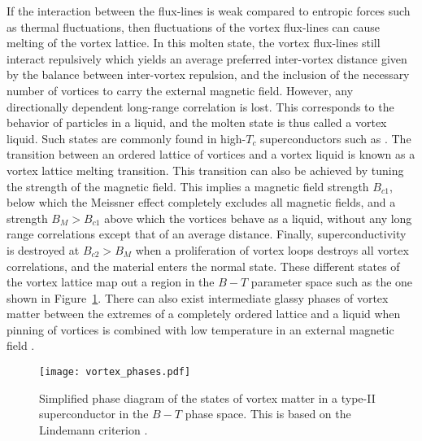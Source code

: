 If the interaction between the flux-lines is weak compared to entropic forces such as thermal fluctuations, then fluctuations of the vortex flux-lines can cause melting of the vortex lattice.
In this molten state, the vortex flux-lines still interact repulsively which yields an average preferred inter-vortex distance given by the balance between inter-vortex repulsion, and the inclusion of the
necessary number of vortices to carry the external magnetic field. However, any directionally dependent long-range correlation is lost. This corresponds to the behavior
of particles in a liquid, and the molten state is thus called a vortex liquid. Such states are commonly found in high-$T_c$ superconductors such as .
The transition between an ordered lattice of vortices and a vortex liquid is known as a vortex lattice melting transition.
This transition can also be achieved by tuning the strength of the magnetic field. This implies a magnetic field strength $B_{c1}$, below which the Meissner effect
completely excludes all magnetic fields, and a strength $B_{M}>B_{c1}$ above which the vortices behave as a liquid, \ie without any long range correlations except that of an average distance.
Finally, superconductivity is destroyed at $B_{c2}>B_M$ when a proliferation of vortex loops destroys all vortex correlations, and the material enters the normal state.
These different states of the vortex lattice map out a region in the $B-T$ parameter space such as the one shown in Figure~\ref{fig:Vor:phases}.
There can also exist intermediate glassy phases of vortex matter between the extremes of a completely ordered lattice and a liquid when pinning of vortices is combined
with low temperature in an external magnetic field \cite{Sanchez19,Koch89}.

\begin{figure}[t]
    \centering
    \texttt{[image: vortex\_phases.pdf]}
    \caption{Simplified phase diagram of the states of vortex matter in a type-II superconductor in the $B-T$ phase space. This is based on the Lindemann criterion \cite{Sonier98}.}
    \label{fig:Vor:phases}
\end{figure}

